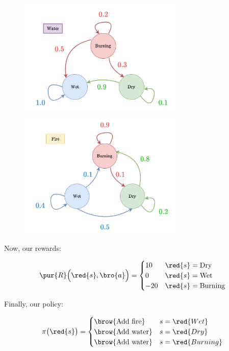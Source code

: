         \begin{figure}[H]
            \includegraphics[width=80mm,scale=0.4]{images/mdp_images/add_water_transition.png}
            \includegraphics[width=80mm,scale=0.4]{images/mdp_images/add_fire_transition.png}
        \end{figure}

        Now, our rewards:

        \begin{equation}
            \pur{R} \Big( \red{s},\bro{a} \Big) =
            \begin{cases}
                10 & \red{s} = \text{Dry} \\
                0 & \red{s} = \text{Wet} \\
                -20 & \red{s} = \text{Burning}
            \end{cases}
        \end{equation}

        Finally, our policy:

        \begin{equation}
            \pi \big( \red{s} \big) =
            \begin{cases}
                \text{\brow{Add fire}} & s = \red{Wet} \\
                \text{\brow{Add water}} & s = \red{Dry} \\
                \text{\brow{Add water}} & s = \red{Burning}
            \end{cases}
        \end{equation}

